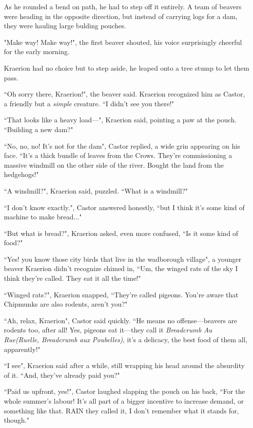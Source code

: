 As he rounded a bend on path, he had to step off it entirely. A team of beavers were heading in the opposite direction, but instead of carrying logs for a dam, they were hauling large bulding pouches.

"Make way! Make way!", the first beaver shouted, his voice surprisingly cheerful for the early morning.

Kraerion had no choice but to step aside, he leaped onto a tree stump to let them pass.

``Oh sorry there, Kraerion!", the beaver said. Kraerion recognized him as Castor, a friendly but a \textit{simple} creature. ``I didn't see you there!"

``That looks like a heavy load---", Kraerion said, pointing a paw at the pouch. ``Building a new dam?"

``No, no, no! It's not for the dam", Castor replied, a wide grin appearing on his face. ``It's a thick bundle of leaves from the Crows. They're commissioning a massive windmill on the other side of the river. Bought the land from the hedgehogs!"

``A windmill?", Kraerion said, puzzled. ``What is a windmill?"

``I don't know exactly.", Castor answered honestly, ``but I think it's some kind of machine to make bread..."

``But what is bread?", Kraerion asked, even more confused, ``Is it some kind of food?"

``Yes! you know those city birds that live in the wadborough village", a younger beaver Kraerion didn't recognize chimed in, ``Um, the winged rats of the sky I think they're called. They eat it all the time!"

``Winged rats?", Kraerion snapped, ``They're called pigeons. You're aware that Chipmunks are also rodents, aren't you?"

``Ah, relax, Kraerion", Castor said quickly. ``He means no offense---beavers are rodents too, after all! Yes, pigeons eat it---they call it \textit{Breadcrumb Au Rue(Ruelle, Breadcrumb aux Poubelles)}, it's a delicacy, the best food of them all, apparently!"

``I see", Kraerion said after a while, still wrapping his head around the absurdity of it. ``And, they've already paid you?"

``Paid us upfront, yes!", Castor laughed slapping the pouch on his back, ``For the whole summer's labour! It's all part of a bigger incentive to increase demand, or something like that. RAIN they called it, I don't remember what it stands for, though."

